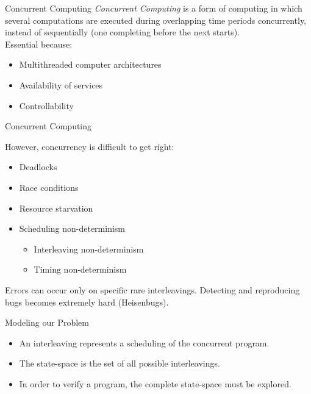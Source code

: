 \documentclass[9pt]{beamer}
\begin{document}
\begin{frame}{Concurrent Computing}
\emph{Concurrent Computing} is a form of computing in which several computations are executed during
overlapping time periods concurrently, instead of sequentially (one completing before the next starts).
\\

Essential because:
\pause
\begin{itemize}[<+->]
    \item Multithreaded computer architectures 
    \item Availability of services
    \item Controllability 
\end{itemize}

\end{frame}

\begin{frame}{Concurrent Computing}

However, concurrency is difficult to get right:
\pause
\begin{itemize}[<+->]
    \item Deadlocks
    \item Race conditions
    \item Resource starvation 
    \item Scheduling non-determinism
    \begin{itemize}[<+->]
        \item Interleaving non-determinism
        \item Timing non-determinism
    \end{itemize}
\end{itemize}
\pause
Errors can occur only on specific rare interleavings. 
Detecting and reproducing bugs becomes extremely hard (Heisenbugs).

\end{frame}

\begin{frame}{Modeling our Problem}

\begin{itemize}[<+->]
    \item An interleaving represents a scheduling of the concurrent program.
    \item The state-space is the set of all possible interleavings.
    \item In order to verify a program, the complete state-space must be explored.
\end{itemize}
    

\end{frame}
\end{document}
